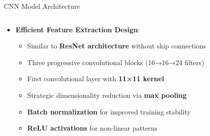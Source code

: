 \documentclass[aspectratio=169,8pt]{beamer}  %
\begin{document}
\begin{frame}{CNN Model Architecture}
\begin{columns}[T]
\begin{column}{0.6\textwidth}
\begin{itemize}
\item \textbf{Efficient Feature Extraction Design}:
  \begin{itemize}
  \item Similar to \textbf{ResNet architecture} without skip connections
  \item Three progressive convolutional blocks (16→16→24 filters)
  \item First convolutional layer with \textbf{11×11 kernel}
  \item Strategic dimensionality reduction via \textbf{max pooling}
  \item \textbf{Batch normalization} for improved training stability
  \item \textbf{ReLU activations} for non-linear patterns
  \end{itemize}
\end{itemize}


\end{column}
\end{columns}
\end{frame}
\end{document}
